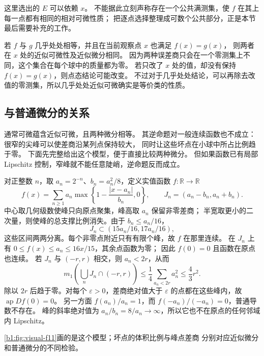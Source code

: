 这里选出的 \(E\) 可以依赖 \(x\)。
不能据此立刻声称存在一个公共满测集，使 \(f\) 在其上每一点都有相同的相对可微性质；
把逐点选择整理成可数个公共部分，正是本节最后需要补充的工作。

\ProseParagraphBreak

若 \(f\) 与 \(g\) 几乎处处相等，并且在当前观察点 \(x\) 也满足 \(f(x)=g(x)\)，
则两者在 \(x\) 处的近似可微性及近似微分相同。
因为两种误差商只会在一个零测集上不同，这个集合在每个球中的质量都为零。
若只改了 \(x\) 处的值，却没有保持 \(f(x)=g(x)\)，则点态结论可能改变。
不过对于几乎处处结论，可以再除去改值的零测集，所以几乎处处近似可微确实是等价类的性质。

\subsection{与普通微分的关系}
\label{b1:subsec:160302}

通常可微蕴含近似可微，且两种微分相等。
其逆命题对一般连续函数也不成立：很窄的尖峰可以使差商沿某列点保持较大，
同时让这些坏点在小球中所占比例趋于零。
下面先完整给出这个模型，便于直接比较两种微分。
但如果函数已有局部 Lipschitz 控制，窄峰就不能任意陡峭，逆命题反而成立。

\begin{proposition}[稀疏的连续尖峰]\label{b1:eg:sparse-peaks-approximate}
对正整数 \(n\)，取 \(a_n=2^{-n}\)、\(b_n=a_n^2/8\)，定义实值函数 \(f:\mathbb R\to\mathbb R\)
\[
 f(x)=\sum_{n\ge1}a_n\max\left\{1-\frac{|x-a_n|}{b_n},0\right\},
 \qquad J_n=(a_n-b_n,a_n+b_n).
\]
中心取几何级数使峰只向原点聚集，峰高取 \(a_n\) 保留非零差商；
半宽取更小的二次量，则使峰的总支撑比例消失。由于 \(b_n\le a_n/16\)，
\[
 J_n\subset(15a_n/16,17a_n/16),
\]
这些区间两两分离。每个非零点附近只有有限个峰，故 \(f\) 在那里连续。
在 \(J_n\) 上有 \(0\le f(x)\le a_n\le16x/15\)，其余点函数为零；
因此 \(f(0)=0\) 且函数在原点也连续。
若 \(J_n\) 与 \((-r,r)\) 相交，则 \(a_n<2r\)，从而
\[
 m_1\left(\bigcup_nJ_n\cap(-r,r)\right)
 \le\frac14\sum_{a_n<2r}a_n^2\le\frac43r^2.
\]
除以 \(2r\) 后趋于零。对每个 \(\varepsilon>0\)，差商绝对值大于
\(\varepsilon\) 的点都在这些峰内，故 \(\operatorname{ap}Df(0)=0\)。
另一方面 \(f(a_n)/a_n=1\)，而 \(f(-a_n)/(-a_n)=0\)，普通导数不存在。
峰的斜率绝对值为 \(a_n/b_n=8/a_n\to\infty\)，所以它也不在原点的任何邻域内 Lipschitz。
\end{proposition}

\cref{b1:fig:visual-f11}画的是这个模型；坏点的体积比例与峰点差商
分别对应近似微分和普通微分的不同检验。

